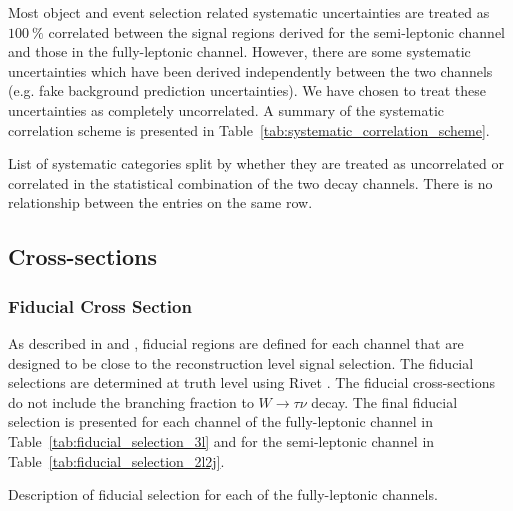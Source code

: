 Most object and event selection related systematic uncertainties are treated as $100~\%$ correlated 
between the signal regions derived for the semi-leptonic channel and those in the fully-leptonic channel.
However, there are some systematic uncertainties which have been derived independently between the 
two channels (e.g. fake background prediction uncertainties). We have chosen to treat these
uncertainties as completely uncorrelated. A summary of the systematic correlation scheme is 
presented in Table~\ref{tab:systematic_correlation_scheme}.

\begin{table}[h!]
\centering

\caption{List of systematic categories split by whether they are treated as uncorrelated or correlated 
in the statistical combination of the two decay channels. There is no relationship between the entries on the same row.  }
\label{tab:systematic_correlation_scheme}
\end{table}




\subsection{Cross-sections}
\subsubsection{Fiducial Cross Section}
\label{sec:fiducial_xsec}


As described in \cite{Butler:2030159} and \cite{Liu:2022894},
fiducial regions are defined for each channel that are designed to 
be close to the reconstruction
level signal selection.
The fiducial selections are determined at truth level using 
Rivet \cite{Buckley:2010ar}.
The fiducial cross-sections do not include the branching fraction 
to $W\rightarrow\tau\nu$ decay.
The final fiducial selection is presented
for each channel of the fully-leptonic channel in Table~\ref{tab:fiducial_selection_3l}
and for the semi-leptonic channel in Table~\ref{tab:fiducial_selection_2l2j}.


\begin{table}[ht!]
\centering
\begin{footnotesize}

\end{footnotesize}
\caption{Description of fiducial selection for each of the fully-leptonic channels.  }
\label{tab:fiducial_selection_3l}
\end{table}


